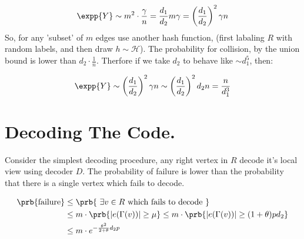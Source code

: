 \begin{equation*}
  \begin{split}
    \expp{Y} \sim m^{2} \cdot \frac{\gamma}{n} = \frac{d_{1}}{d_{2}} m\gamma =
    \left( \frac{d_1}{d_2} \right)^{2}\gamma n
  \end{split}
\end{equation*}
So, for any 'subset' of $m$ edges use another hash function, (first labaling
$R$ with random labels, and then draw $h \sim \mathcal{H}$). The probability
for collision, by the union bound is lower than $ d_2 \cdot \frac{1}{n}$.
Therfore if we take $d_2$ to behave like $\sim  d_{1}^{5}$, then:

\begin{equation*}
  \begin{split}
    \expp{Y} \sim  \left( \frac{d_1}{d_2} \right)^{2}\gamma n \sim   \left(
    \frac{d_1}{d_2} \right)^{2} d_2 n = \frac{n}{d_{1}^{3}}
  \end{split}
\end{equation*}

\section{Decoding The Code.}

Consider the simplest decoding procedure, any right vertex in $R$ decode it's
local view using decoder $D$. The probability of failure is lower than the
probability that there is a single vertex which fails to decode.

\begin{equation*}
  \begin{split}
    \prb{\text{failure}} & \le \prb{\ \exists v \in R \text{  which fails to
    decode }} \\
    & \le m \cdot \prb{ |e(\Gamma(v))| \ge \mu  }\le  m \cdot \prb{
    |e(\Gamma(v))| \ge (1 + \theta) p d_{2} } \\
    & \le m \cdot e^{-\frac{\theta^{2}}{2+\theta} d_{2}p}
  \end{split}
\end{equation*}

